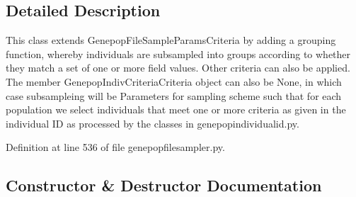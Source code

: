 \subsection{Detailed Description}
\begin{DoxyVerb}This class extends GenepopFileSampleParamsCriteria
by adding a grouping function, whereby individuals
are subsampled into groups according to whether they
match a set of one or more field values. Other criteria
can also be applied.  The member GenepopIndivCriteriaCriteria 
object can also be None, in which case subsampleing will be
Parameters for sampling scheme such that for each population
we select individuals that meet one or more criteria as 
given in the individual ID as processed by the classes in
genepopindividualid.py. 
\end{DoxyVerb}
 

Definition at line 536 of file genepopfilesampler.\+py.



\subsection{Constructor \& Destructor Documentation}
